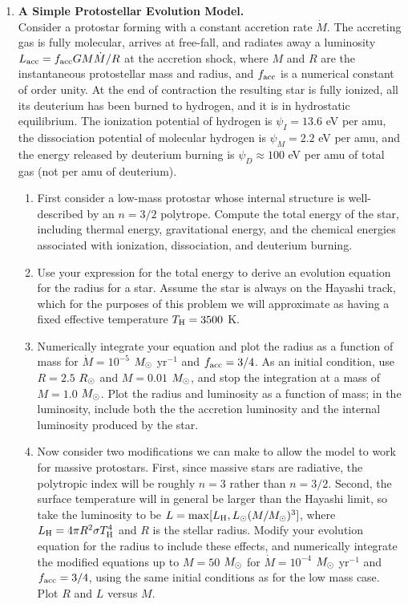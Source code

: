 \problemset

\begin{enumerate}

\item {\bf A Simple Protostellar Evolution Model.}\\
Consider a protostar forming with a constant accretion rate $\dot{M}$. The accreting gas is fully molecular, arrives at free-fall, and radiates away a luminosity $L_{\rm acc} = f_{\rm acc} G M \dot{M}/R$ at the accretion shock, where $M$ and $R$ are the instantaneous protostellar mass and radius, and $f_{\rm acc}$ is a numerical constant of order unity. At the end of contraction the resulting star is fully ionized, all its deuterium has been burned to hydrogen, and it is in hydrostatic equilibrium. The ionization potential of hydrogen is $\psi_I = 13.6$ eV per amu, the dissociation potential of molecular hydrogen is $\psi_M=2.2$ eV per amu, and the energy released by deuterium burning is $\psi_D\approx 100$ eV per amu of total gas (not per amu of deuterium).
\begin{enumerate}
\item First consider a low-mass protostar whose internal structure is well-described by an $n=3/2$ polytrope. Compute the total energy of the star, including thermal energy, gravitational energy, and the chemical energies associated with ionization, dissociation, and deuterium burning.
\item Use your expression for the total energy to derive an evolution equation for the radius for a star. Assume the star is always on the Hayashi track, which for the purposes of this problem we will approximate as having a fixed effective temperature $T_{\rm H} = 3500$ K.
\item Numerically integrate your equation and plot the radius as a function of mass for $\dot{M} = 10^{-5}$ $M_{\odot}$ yr$^{-1}$ and $f_{\rm acc}=3/4$. As an initial condition, use $R=2.5$ $R_{\odot}$ and $M=0.01$ $M_{\odot}$, and stop the integration at a mass of $M=1.0$ $M_{\odot}$. Plot the radius and luminosity as a function of mass; in the luminosity, include both the the accretion luminosity and the internal luminosity produced by the star.
\item Now consider two modifications we can make to allow the model to work for massive protostars. First, since massive stars are radiative, the polytropic index will be roughly $n=3$ rather than $n=3/2$. Second, the surface temperature will in general be larger than the Hayashi limit, so take the luminosity to be $L=\max[L_{\rm H}, L_{\odot}(M/M_{\odot})^3]$, where $L_{\rm H}=4\pi R^2 \sigma T_{\rm H}^4$ and $R$ is the stellar radius. Modify your evolution equation for the radius to include these effects, and numerically integrate the modified equations up to $M=50$ $M_{\odot}$ for $\dot{M} = 10^{-4}$ $M_{\odot}$ yr$^{-1}$ and $f_{\rm acc}=3/4$, using the same initial conditions as for the low mass case. Plot $R$ and $L$ versus $M$.

\end{enumerate}
\end{enumerate}
